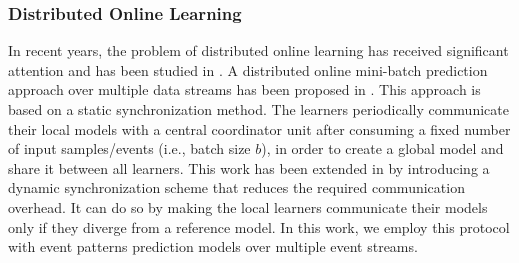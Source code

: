 
\subsubsection*{Distributed Online Learning}
\par In recent years, the problem of distributed online learning has received significant attention and has been studied in \cite{langford2009slow,yan2013distributed,xiao2010dual,dekel2012optimal,kamp2014communication}.  A distributed online mini-batch prediction approach over multiple data streams has been proposed in \cite{dekel2012optimal}. This approach is based on a static synchronization method. The learners periodically communicate  their local models with a central coordinator unit after consuming a fixed number of input samples/events (i.e., batch size $b$), in order to  create a global model and share it between all learners. This work has been extended in \cite{kamp2014communication} by introducing a
dynamic synchronization scheme that reduces the required communication overhead. It can do so by making the local learners communicate their models only if they diverge from a reference model. In this work, we employ this protocol with event patterns prediction models over multiple event streams. 
